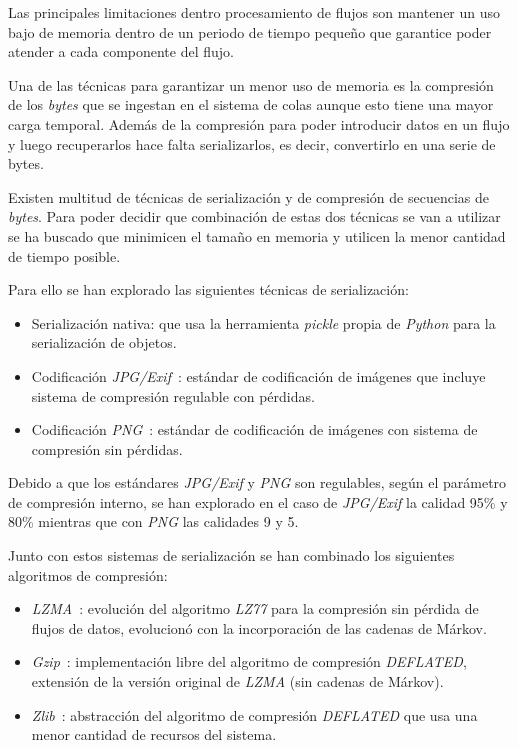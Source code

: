 Las principales limitaciones dentro procesamiento de flujos son mantener un uso bajo de memoria dentro de un periodo de tiempo pequeño que garantice poder atender a cada componente del flujo.

Una de las técnicas para garantizar un menor uso de memoria es la compresión de los \textit{bytes} que se ingestan en el sistema de colas aunque esto tiene una mayor carga temporal. Además de la compresión para poder introducir datos en un flujo y luego recuperarlos hace falta serializarlos, es decir, convertirlo en una serie de bytes.

Existen multitud de técnicas de serialización y de compresión de secuencias de \textit{bytes}. Para poder decidir que combinación de estas dos técnicas se van a utilizar se ha buscado que minimicen el tamaño en memoria y utilicen la menor cantidad de tiempo posible.

Para ello se han explorado las siguientes técnicas de serialización:

\begin{itemize}
	\item Serialización nativa: que usa la herramienta \textit{pickle} propia de \textit{Python} para la serialización de objetos.
	\item Codificación \textit{JPG/Exif}~\cite{pennebaker1992jpeg}: estándar de codificación de imágenes que incluye sistema de compresión regulable con pérdidas.
	\item Codificación \textit{PNG}~\cite{boutell1997png}: estándar de codificación de imágenes con sistema de compresión sin pérdidas.
\end{itemize}

Debido a que los estándares \textit{JPG/Exif} y \textit{PNG} son regulables, según el parámetro de compresión interno, se han explorado en el caso de \textit{JPG/Exif} la calidad 95\% y 80\% mientras que con \textit{PNG} las calidades 9 y 5.

Junto con estos sistemas de serialización se han combinado los siguientes algoritmos de compresión:

\begin{itemize}
	\item \textit{LZMA}~\cite{tool:pylzma,seroussi1993lempel}: evolución del algoritmo \textit{LZ77} para la compresión sin pérdida de flujos de datos, evolucionó con la incorporación de las cadenas de Márkov.
	\item \textit{Gzip}~\cite{tool:gzip}: implementación libre del algoritmo de compresión \textit{DEFLATED}, extensión de la versión original de \textit{LZMA} (sin cadenas de Márkov).
	\item \textit{Zlib}~\cite{tool:zlib}: abstracción del algoritmo de compresión \textit{DEFLATED} que usa una menor cantidad de recursos del sistema.
\end{itemize}

